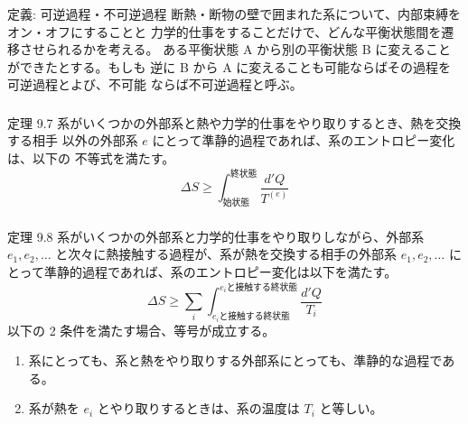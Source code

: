 \documentclass[aspectratio=149]{beamer}
\begin{document}
\begin{frame}
	\frametitle{}
	\begin{block}{定義: 可逆過程・不可逆過程}
		断熱・断物の壁で囲まれた系について、内部束縛をオン・オフにすることと
		力学的仕事をすることだけで、どんな平衡状態間を遷移させられるかを考える。
		ある平衡状態 A から別の平衡状態 B に変えることができたとする。もしも
		逆に B から A に変えることも可能ならばその過程を可逆過程とよび、不可能
		ならば不可逆過程と呼ぶ。
	\end{block}
\end{frame}

\begin{frame}
	\frametitle{}
	\begin{block}{定理 9.7}
		系がいくつかの外部系と熱や力学的仕事をやり取りするとき、熱を交換する相手
		以外の外部系 \(e\) にとって準静的過程であれば、系のエントロピー変化は、以下の
		不等式を満たす。
		\[\Delta S\geq\int^{\text{終状態}}_{\text{始状態}}\frac{d'Q}{T^{(e)}}\tag{9.13}\]
	\end{block}
\end{frame}

\begin{frame}
	\frametitle{}
	\begin{block}{定理 9.8}
		系がいくつかの外部系と力学的仕事をやり取りしながら、外部系 \(e_1, e_2,\dotsc\)
		と次々に熱接触する過程が、系が熱を交換する相手の外部系 \(e_1, e_2,\dotsc\) に
		とって準静的過程であれば、系のエントロピー変化は以下を満たす。
		\[\Delta S\geq\sum_i
		\int^{\text{\(e_i\)と接触する終状態}}_{\text{\(e_i\)と接触する終状態}}
		\frac{d'Q}{T_i}\tag{9.18}\]
		以下の 2 条件を満たす場合、等号が成立する。
		\begin{enumerate}
			\item 系にとっても、系と熱をやり取りする外部系にとっても、準静的な過程である。
			\item 系が熱を \(e_i\) とやり取りするときは、系の温度は \(T_i\) と等しい。
		\end{enumerate}
	\end{block}
\end{frame}
\end{document}
